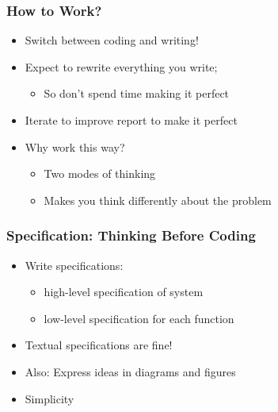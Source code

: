 \documentclass[hyperref={pdfpagelabels=false}, aspectratio=1610]{beamer}
\begin{document}
\begin{frame}
\frametitle{How to Work?}
\begin{block}{}
 \begin{itemize}
  \item<2-> Switch between coding and writing!
  \item<2-> Expect to rewrite everything you write; 
  \begin{itemize}
  	\item<2-> So don't spend time making it perfect 
  \end{itemize}
  \item<2-> Iterate to improve report to make it perfect
  \item<2-> Why work this way?
  \begin{itemize}
	\item<2-> Two modes of thinking
  	\item<2-> Makes you think differently about the problem 
  \end{itemize}
 \end{itemize}
\end{block}
\end{frame}

\begin{frame}
\frametitle{Specification: Thinking Before Coding}
\begin{block}{}
 \begin{itemize}
  \item Write specifications:
  \begin{itemize}
  	\item high-level specification of system
	\item low-level specification for each function
  \end{itemize}
  \item Textual specifications are fine!
  \item Also: Express ideas in diagrams and figures
  \item Simplicity
 \end{itemize}
\end{block}
\end{frame}
\end{document}
